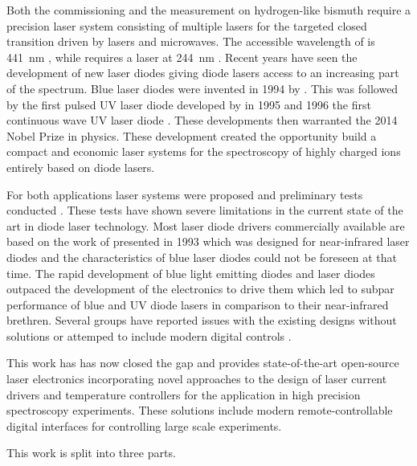 Both the commissioning and the measurement on hydrogen-like bismuth require a precision laser system consisting of multiple lasers for the targeted closed transition driven by lasers and microwaves. The accessible wavelength of  is \qty{441}{\nm} \cite{ar13+_wavelength}, while  requires a laser at \qty{244}{\nm} \cite{bi82+_wavelength}. Recent years have seen the development of new laser diodes giving diode lasers access to an increasing part of the spectrum. Blue laser diodes were invented in 1994 by \citeauthor{Nakamura_1996} \cite{Nakamura_1996}. This was followed by the first pulsed UV laser diode developed by \citeauthor{uv_pulsed_laser_diode_first} \cite{uv_pulsed_laser_diode_first} in 1995 and 1996 the first continuous wave UV laser diode \cite{uv_cw_laser_diode_first}. These developments then warranted the 2014 Nobel Prize in physics. These development created the opportunity build a compact and economic laser systems for the spectroscopy of highly charged ions entirely based on diode lasers.

For both applications laser systems were proposed and preliminary tests conducted \cite{thesis_baus,thesis_alex,thesis_tilman,thesis_seppo}. These tests have shown severe limitations in the current state of the art in diode laser technology. Most laser diode drivers commercially available are based on the work of \citeauthor{libbrecht_hall} presented in 1993 \cite{libbrecht_hall} which was designed for near-infrared laser diodes and the characteristics of blue laser diodes could not be foreseen at that time. The rapid development of blue light emitting diodes and laser diodes outpaced the development of the electronics to drive them which led to subpar performance of blue and UV diode lasers in comparison to their near-infrared brethren. Several groups have reported issues with the existing designs \cite{laser_driver_mosfet_noise} without solutions or attemped to include modern digital controls \cite{laser_driver_digital}.

This work has has now closed the gap and provides state-of-the-art open-source laser electronics incorporating novel approaches to the design of laser current drivers and temperature controllers for the application in high precision spectroscopy experiments. These solutions include modern remote-controllable digital interfaces for controlling large scale experiments.

This work is split into three parts.\\

